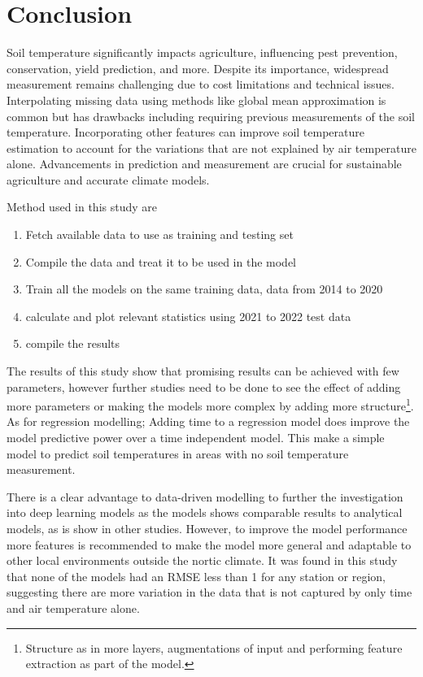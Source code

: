 \section{Conclusion}


Soil temperature significantly impacts agriculture, influencing pest prevention, conservation, yield prediction, and more. Despite its importance, widespread measurement remains challenging due to cost limitations and technical issues. Interpolating missing data using methods like global mean approximation is common but has drawbacks including requiring previous measurements of the soil temperature. Incorporating other features can improve soil temperature estimation to account for the variations that are not explained by air temperature alone. Advancements in prediction and measurement are crucial for sustainable agriculture and accurate climate models.

Method used in this study are
\begin{enumerate}
	\item Fetch available data to use as training and testing set
	\item Compile the data and treat it to be used in the model
	\item Train all the models on the same training data, data from 2014 to 2020
	\item calculate and plot relevant statistics using 2021 to 2022 test data
	\item compile the results
\end{enumerate} 

The results of this study show that promising results can be achieved with few parameters, however further studies need to be done to see the effect of adding more parameters or making the models more complex by adding more structure\footnote{Structure as in more layers, augmentations of input and performing feature extraction as part of the model.}. As for regression modelling; Adding time to a regression model does improve the model predictive power over a time independent model. This make a simple model to predict soil temperatures in areas with no soil temperature measurement. 

There is a clear advantage to data-driven modelling to further the investigation into deep learning models as the models shows comparable results to analytical models, as is show in other studies\cite{feng_estimation_2019,li_attention-aware_2022,li_modeling_2020}. However, to improve the model performance more features is recommended to make the model more general and adaptable to other local environments outside the nortic climate. It was found in this study that none of the models had an RMSE less than 1 for any station or region, suggesting there are more variation in the data that is not captured by only time and air temperature alone.

